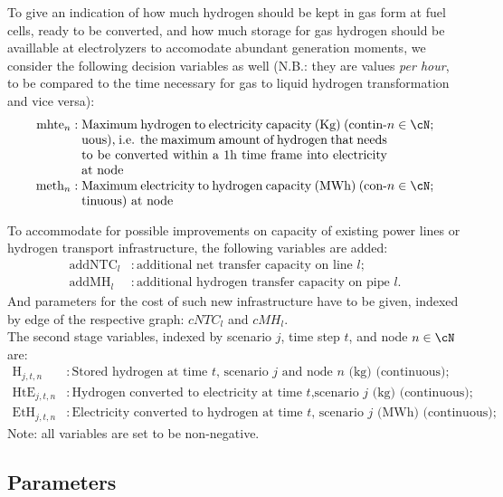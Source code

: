 \documentclass[english]{article}
\numberwithin{definition}{section}
\numberwithin{theorem}{section}
\numberwithin{problem}{section}
\begin{document}
To give an indication of how much hydrogen should be kept in gas form at fuel cells, ready to be converted, and how much storage for gas hydrogen should be availlable at electrolyzers to accomodate abundant generation moments, we consider the following decision variables as well (N.B.: they are values \textit{per hour}, to be compared to the time necessary for gas to liquid hydrogen transformation and vice versa):
\begin{align*}
    \text{mhte}_n & : \parbox[t]{0.70\textwidth}{
    Maximum hydrogen to electricity capacity (Kg) (continuous), i.e. the maximum amount of hydrogen that needs to be converted within a 1h time frame into electricity at node} n \in \cN; \\
    \text{meth}_n & : \parbox[t]{0.70\textwidth}{Maximum electricity to hydrogen capacity (MWh) (continuous) at node} n \in \cN;
\end{align*}

To accommodate for possible improvements on capacity of existing power lines or hydrogen transport infrastructure, the following variables are added:
\begin{align*}
    \text{addNTC}_l & : \text{additional net transfer capacity on line $l$;}\\
    \text{addMH}_l & : \text{additional hydrogen transfer capacity on pipe $l$}.
\end{align*}
And parameters for the cost of such new infrastructure have to be given, indexed by edge of the respective graph: $cNTC_l$ and $cMH_l$.\\


The second stage variables, indexed by scenario \(j\), time step \(t\), and node \(n \in \cN\) are:
\begin{align*}
    \text{H}_{j,t,n} & : \text{Stored hydrogen at time \(t\), scenario \(j\) and node \(n\) (kg) (continuous)};\\
    \text{HtE}_{j,t,n} & : \text{Hydrogen converted to electricity at time \(t\),scenario \(j\) (kg) (continuous);} \\
    \text{EtH}_{j,t,n} & : \text{Electricity converted to hydrogen at time \(t\), scenario \(j\) (MWh) (continuous);}
\end{align*}
Note: all variables are set to be non-negative.



\subsection{Parameters} \label{subsection: Parameters}
\end{document}
